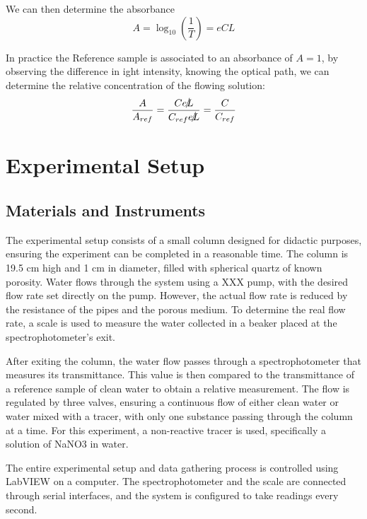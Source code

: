 We can then determine the absorbance
\begin{equation}
    A = \log_{10}\left(\frac{1}{T}\right) = e C L
\end{equation}

In practice the Reference sample is associated to an absorbance of $A=1$, 
by observing the difference in ight intensity, knowing the optical path, we can determine 
the relative concentration of the flowing solution:
\begin{equation}
    \frac{A}{A_{ref}} = \frac{C \slashed{eL}}{C_{ref} \slashed{eL}} = \frac{C}{C_{ref}}
\end{equation}

\section{Experimental Setup}

\subsection{Materials and Instruments}
The experimental setup consists of a small column designed for didactic purposes, 
ensuring the experiment can be completed in a reasonable time. 
The column is 19.5 cm high and 1 cm in diameter, filled with spherical quartz of known porosity. 
Water flows through the system using a XXX pump, with the desired flow rate set directly on the pump. 
However, the actual flow rate is reduced by the resistance of the pipes and the porous medium. 
To determine the real flow rate, a scale is used to measure the water collected in a beaker placed at the spectrophotometer's exit.

After exiting the column, the water flow passes through a spectrophotometer that measures its transmittance. 
This value is then compared to the transmittance of a reference sample of clean water to obtain a relative measurement. 
The flow is regulated by three valves, ensuring a continuous flow of either clean water or water mixed with a tracer,
 with only one substance passing through the column at a time. For this experiment, a non-reactive tracer is used, 
 specifically a solution of NaNO3 in water.

The entire experimental setup and data gathering process is controlled using LabVIEW on a computer. 
The spectrophotometer and the scale are connected through serial interfaces, 
and the system is configured to take readings every second.


